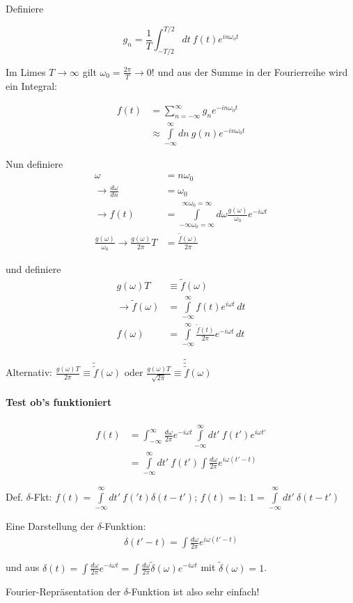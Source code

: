 \documentclass[a4paper,ngerman]{scrbook}
\begin{document}
Definiere

\[
g_n = \frac{1}{T} \int_{-T/2}^{T/2}\! dt\ f(t) e^{in\omega_o t}
\]

Im Limes $T\to \infty$ gilt $\omega_0 = \frac{2\pi}{T} \to 0$! und aus der Summe in der Fourierreihe wird ein Integral:

\begin{align*}
  f(t) &= \sum_{n=-\infty}^\infty g_n e^{-in\omega_0 t}\\
  &\approx \int\limits_{-\infty}^\infty \! dn\ g(n) e^{-in\omega_0 t}
\end{align*}

Nun definiere
\begin{align*}
  \omega &= n\omega_0\\
  \to \frac{d\omega}{dn} &= \omega_0\\
  \to f(t) &=   \int\limits_{-\infty\omega_0 = \infty}^{\infty\omega_0 =     \infty}\! d\omega \frac{g(\omega)}{\omega_0} e^{-i\omega t}\\
\frac{g(\omega)}{\omega_0} \to \frac{g(\omega)}{2\pi}T &= \frac{\tilde{f}(\omega)}{2\pi}
\end{align*}

und definiere
\begin{align*}
  g(\omega)T &\equiv \tilde{f}(\omega)\\
  \to   \tilde{f}(\omega) &= \int\limits_{-\infty}^\infty f(t) e^{i\omega t}\, dt\\
f(\omega) &= \int\limits_{-\infty}^\infty \frac{\tilde{f}(t)}{2\pi} e^{-i\omega t}\, dt
\end{align*}

Alternativ: $\frac{g(\omega)T}{2\pi} \equiv \tilde{\tilde{f}}(\omega)$ oder $\frac{g(\omega)T}{\sqrt{2\pi}} \equiv \tilde{\tilde{\tilde{f}}}(\omega)$

\paragraph{Test ob's funktioniert}

\begin{align*}
  f(t) &= \int_{-\infty}^\infty \! \frac{d\omega}{2\pi} e^{-i\omega t} \int\limits_{-\infty}^{\infty}\! dt'\ f(t') e^{i\omega t'}\\
&= \int\limits_{-\infty}^{\infty}\! dt'\ f(t') \int \frac{d\omega}{2\pi} e^{i\omega(t'-t)}
\end{align*}

Def. $\delta$-Fkt: $f(t) = \int\limits_{-\infty}^{\infty}\! dt'\ f('t) \delta(t-t')$; $f(t) = 1$: $1 = \int\limits_{-\infty}^{\infty}\! dt'\ \delta(t-t')$

Eine Darstellung der $\delta$-Funktion:
\begin{align*}
  \delta(t'-t) = \int\frac{d\omega}{2\pi} e^{i\omega(t'-t)}
\end{align*}

und aus $\delta(t) = \int\frac{d\omega}{2\pi} e^{-i\omega t} = \int\frac{d\omega}{2\pi} \tilde{\delta}(\omega) e^{-i\omega t}$ mit $\tilde\delta(\omega) = 1$.

Fourier-Repräsentation der $\delta$-Funktion ist also sehr einfach!
\end{document}
